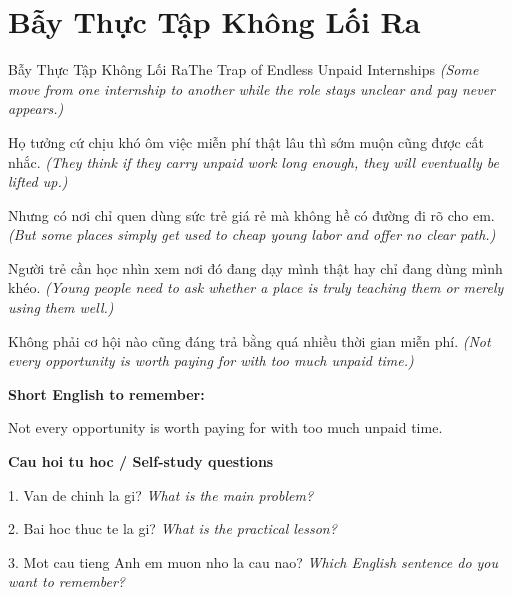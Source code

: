 \section{Bẫy Thực Tập Không Lối Ra}
\begin{truyen}{Bẫy Thực Tập Không Lối Ra}{The Trap of Endless Unpaid Internships}
\textit{(Some move from one internship to another while the role stays unclear and pay never appears.)}

Họ tưởng cứ chịu khó ôm việc miễn phí thật lâu thì sớm muộn cũng được cất nhắc.
\textit{(They think if they carry unpaid work long enough, they will eventually be lifted up.)}

Nhưng có nơi chỉ quen dùng sức trẻ giá rẻ mà không hề có đường đi rõ cho em.
\textit{(But some places simply get used to cheap young labor and offer no clear path.)}

Người trẻ cần học nhìn xem nơi đó đang dạy mình thật hay chỉ đang dùng mình khéo.
\textit{(Young people need to ask whether a place is truly teaching them or merely using them well.)}

\end{truyen}

\begin{baihoc}
Không phải cơ hội nào cũng đáng trả bằng quá nhiều thời gian miễn phí.
\textit{(Not every opportunity is worth paying for with too much unpaid time.)}
\end{baihoc}

\begin{ghinhoanh}
\textbf{Short English to remember:}

Not every opportunity is worth paying for with too much unpaid time.

\end{ghinhoanh}

\begin{tuhocnhanh}
\textbf{Cau hoi tu hoc / Self-study questions}

1. Van de chinh la gi? \textit{What is the main problem?}

2. Bai hoc thuc te la gi? \textit{What is the practical lesson?}

3. Mot cau tieng Anh em muon nho la cau nao? \textit{Which English sentence do you want to remember?}
\end{tuhocnhanh}
\ngancach

